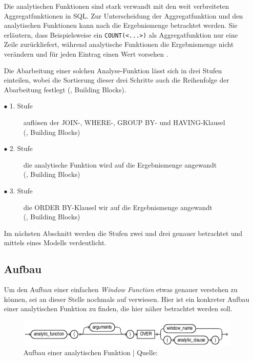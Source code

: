 Die analytischen Funktionen sind stark verwandt mit den weit verbreiteten
Aggregatfunktionen in SQL. Zur Unterscheidung der Aggregatfunktion und den analytischen
Funktionen kann nach \citet{Nuijten2023} die Ergebnismenge betrachtet werden. Sie
erläutern, dass Beispielsweise ein \texttt{COUNT(<...>)} als Aggregatfunktion nur
eine Zeile zurückliefert, während analytische Funktionen die Ergebnismenge nicht
verändern und für jeden Eintrag einen Wert vorsehen \citep{Nuijten2023}.

Die Abarbeitung einer solchen Analyse-Funktion lässt sich in drei Stufen einteilen,
wobei die Sortierung dieser drei Schritte auch die Reihenfolge der Abarbeitung
festlegt (\cite{Nuijten2023}, Building Blocks).
\begin{description}
	\item[$\bullet$ 1. Stufe] auflösen der JOIN-, WHERE-, GROUP BY- und HAVING-Klausel
		\\ (\cite{Nuijten2023}, Building Blocks)

	\item[$\bullet$ 2. Stufe] die analytische Funktion wird auf die Ergebnismenge angewandt
		\\ (\cite{Nuijten2023}, Building Blocks)

	\item[$\bullet$ 3. Stufe] die ORDER BY-Klausel wir auf die Ergebnismenge angewandt
		\\ (\cite{Nuijten2023}, Building Blocks)
\end{description}
Im nächsten Abschnitt werden die Stufen zwei und drei genauer betrachtet und
mittels eines Modells verdeutlicht.

\subsection{Aufbau}
Um den Aufbau einer einfachen \textit{Window Function} etwas genauer verstehen zu
können, sei an dieser Stelle nochmals auf \cite{oracle} verwiesen. Hier ist ein konkreter
Aufbau einer analytischen Funktion zu finden, die hier näher betrachtet werden
soll.

\begin{figure}[h]
	\centering
	\includegraphics[scale=0.5]{img/aufbauAnalyticFunction.jpg}
	\caption{ Aufbau einer analytischen Funktion | Quelle: \cite{oracle}}
	\label{fig:aufbauAnalyticFunction}
\end{figure}

